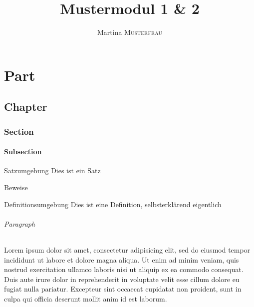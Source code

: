 \documentclass[red]{skript}
\author{Martina \textsc{Musterfrau}}
\title{Mustermodul 1 \& 2 \\\subtitleformat{Skript zum Mustermodul Dinge Bla}}
\begin{document}
\maketitle

\tableofcontents

\part{Part}
\chapter{Chapter}
\section{Section}
\subsection{Subsection}
\begin{satz}{Satzumgebung}
	Dies ist ein Satz
\end{satz}
\clearpage
\begin{beweis}
	Beweise
\end{beweis}

\begin{definition}{Definitionsumgebung}
	Dies ist eine Definition, selbsterklärend eigentlich
\end{definition}
\paragraph{Paragraph}
Lorem ipsum dolor sit amet, consectetur adipisicing elit, sed do eiusmod
tempor incididunt ut labore et dolore magna aliqua. Ut enim ad minim veniam,
quis nostrud exercitation ullamco laboris nisi ut aliquip ex ea commodo
consequat. Duis aute irure dolor in reprehenderit in voluptate velit esse
cillum dolore eu fugiat nulla pariatur. Excepteur sint occaecat cupidatat non
proident, sunt in culpa qui officia deserunt mollit anim id est laborum.
\end{document}
